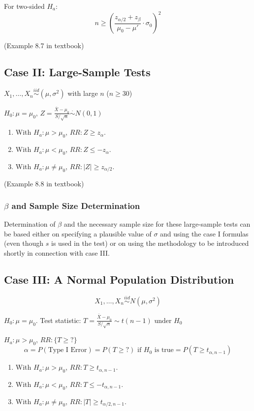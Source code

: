 For two-sided $H_a$:
\[n \geq \left(\frac{z_{\alpha/2}+ z_{\beta}}{\mu_0-\mu'}\cdot\sigma_0\right)^2\]

\begin{exmp}
(Example 8.7 in textbook)
\end{exmp}

\subsection{Case II: Large-Sample Tests}
$X_1,\dots,X_n \overset{iid}{\sim} (\mu,\sigma^2)$ with large $n$ ($n \geq 30$)

$H_0:\mu=\mu_0$, $Z=\frac{\bar{X}-\mu_0}{S/\sqrt{n}} \overset{\cdot}{\sim}N(0,1)$
\begin{enumerate}
\item With $H_a: \mu>\mu_0$, $RR:Z\geq z_{\alpha}$.
\item With $H_a: \mu<\mu_0$, $RR:Z\leq -z_{\alpha}$.
\item With $H_a: \mu\neq\mu_0$, $RR:|Z|\geq z_{\alpha/2}$.
\end{enumerate}

\begin{exmp}
(Example 8.8 in textbook)
\end{exmp}

\subsubsection{$\beta$ and Sample Size Determination}

Determination of $\beta$ and the necessary sample size for these large-sample tests can be based either on specifying a plausible value of $\sigma$ and using the case I formulas (even though $s$ is used in the test) or on using the methodology to be introduced shortly in connection with case III.

\subsection{Case III: A Normal Population Distribution}
\[X_1,\dots,X_n \overset{iid}{\sim} N(\mu,\sigma^2)\]

$H_0:\mu=\mu_0$. Test statistic: $T=\frac{\bar{X}-\mu_0}{S/\sqrt{n}} \sim t(n-1) \text{ under } H_0$

$H_a: \mu>\mu_0$, $RR:\{T\geq ?\}$
\[\alpha=P(\text{Type I Error})=P(T\geq ?) \text{ if }H_0\text{ is true} =P(T\geq t_{\alpha,n-1}) \]

\begin{enumerate}
\item With $H_a: \mu>\mu_0$, $RR:T\geq t_{\alpha,n-1}$.
\item With $H_a: \mu<\mu_0$, $RR:T\leq -t_{\alpha,n-1}$.
\item With $H_a: \mu\neq\mu_0$, $RR:|T|\geq t_{\alpha/2,n-1}$.
\end{enumerate}

